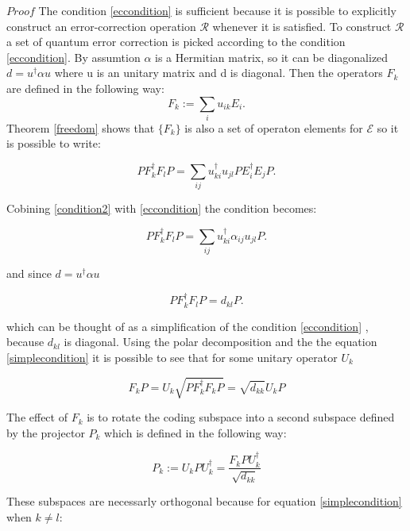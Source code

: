 \documentclass{article}
\begin{document}
$Proof$
The condition \ref{eccondition} is sufficient because it
is possible to explicitly construct an error-correction operation
$\mathcal{R}$ whenever it is satisfied.
To construct $\mathcal{R}$ a set of quantum error correction is picked
according to the condition \ref{eccondition}.
By assumtion $\alpha$ is a Hermitian matrix, so it can be diagonalized
$d =u^\dagger \alpha u$ where u is an unitary matrix and d is diagonal.
Then the operators $F_k$ are defined in the following way:
\begin{equation}
	F_k := \sum_i u_{ik} E_i.
\end{equation}
Theorem \ref{freedom} shows that $\{F_k\}$ is also a set of operaton
elements for $\mathcal{E}$ so it is possible to write:

\begin{equation}
	\label{condition2}
	P F_k^\dagger F_l P = \sum_{ij} u_{ki}^\dagger u_{jl} P E_{i}^\dagger E_j P.
\end{equation}

Cobining \ref{condition2} with \ref{eccondition}
the condition becomes:

\begin{equation}
	P F_k^\dagger F_l P = \sum_{ij} u_{ki}^\dagger \alpha_{ij} u_{jl} P.
\end{equation}

and since $d = u^\dagger \alpha u$

\begin{equation}
	\label{simplecondition}
	P F_k^\dagger F_l P = d_{kl}P.
\end{equation}

which can be thought of as a simplification of the condition \ref{eccondition} ,
because $d_{kl}$ is diagonal.
Using the polar decomposition and the the equation \ref{simplecondition} it is
possible to see that for some unitary operator $U_k$

\begin{equation}
	F_k P = U_k \sqrt{PF_k^\dagger F_k P} = \sqrt{d_{kk}} U_k P
\end{equation}

The effect of $F_k$ is to rotate the coding subspace into a second subspace defined by
the projector $P_k$ which is defined in the following way:

\begin{equation}
	\label{defpk}
	P_k := U_k P U_k^\dagger = \dfrac{F_k P U_k^\dagger}{\sqrt{d_{kk}}}
\end{equation}

These subspaces are necessarly orthogonal because for equation \ref{simplecondition}
when $k \neq l$:
\end{document}
